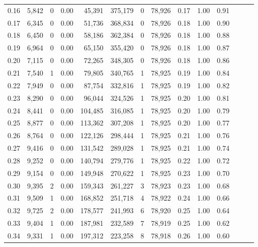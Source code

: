 \begin{tabular}{rrrrrrrrrrrrrr}
0.16 &  5,842 &      0 &  0.00 &   45,391 &  375,179 &       0 &  78,926 &  0.17 &  1.00 &      0.91 \\
0.17 &  6,345 &      0 &  0.00 &   51,736 &  368,834 &       0 &  78,926 &  0.18 &  1.00 &      0.90 \\
0.18 &  6,450 &      0 &  0.00 &   58,186 &  362,384 &       0 &  78,926 &  0.18 &  1.00 &      0.88 \\
0.19 &  6,964 &      0 &  0.00 &   65,150 &  355,420 &       0 &  78,926 &  0.18 &  1.00 &      0.87 \\
0.20 &  7,115 &      0 &  0.00 &   72,265 &  348,305 &       0 &  78,926 &  0.18 &  1.00 &      0.86 \\
0.21 &  7,540 &      1 &  0.00 &   79,805 &  340,765 &       1 &  78,925 &  0.19 &  1.00 &      0.84 \\
0.22 &  7,949 &      0 &  0.00 &   87,754 &  332,816 &       1 &  78,925 &  0.19 &  1.00 &      0.82 \\
0.23 &  8,290 &      0 &  0.00 &   96,044 &  324,526 &       1 &  78,925 &  0.20 &  1.00 &      0.81 \\
0.24 &  8,441 &      0 &  0.00 &  104,485 &  316,085 &       1 &  78,925 &  0.20 &  1.00 &      0.79 \\
0.25 &  8,877 &      0 &  0.00 &  113,362 &  307,208 &       1 &  78,925 &  0.20 &  1.00 &      0.77 \\
0.26 &  8,764 &      0 &  0.00 &  122,126 &  298,444 &       1 &  78,925 &  0.21 &  1.00 &      0.76 \\
0.27 &  9,416 &      0 &  0.00 &  131,542 &  289,028 &       1 &  78,925 &  0.21 &  1.00 &      0.74 \\
0.28 &  9,252 &      0 &  0.00 &  140,794 &  279,776 &       1 &  78,925 &  0.22 &  1.00 &      0.72 \\
0.29 &  9,154 &      0 &  0.00 &  149,948 &  270,622 &       1 &  78,925 &  0.23 &  1.00 &      0.70 \\
0.30 &  9,395 &      2 &  0.00 &  159,343 &  261,227 &       3 &  78,923 &  0.23 &  1.00 &      0.68 \\
0.31 &  9,509 &      1 &  0.00 &  168,852 &  251,718 &       4 &  78,922 &  0.24 &  1.00 &      0.66 \\
0.32 &  9,725 &      2 &  0.00 &  178,577 &  241,993 &       6 &  78,920 &  0.25 &  1.00 &      0.64 \\
0.33 &  9,404 &      1 &  0.00 &  187,981 &  232,589 &       7 &  78,919 &  0.25 &  1.00 &      0.62 \\
0.34 &  9,331 &      1 &  0.00 &  197,312 &  223,258 &       8 &  78,918 &  0.26 &  1.00 &      0.60 \\

\end{tabular}
